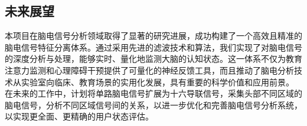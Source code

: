\documentclass{ctexart}
\begin{document}
		\subsection{未来展望}
			本项目在脑电信号分析领域取得了显著的研究进展，成功构建了一个高效且精准的脑电信号特征分离体系。通过采用先进的滤波技术和算法，我们实现了对脑电信号的深度分析与处理，能够实时、量化地监测大脑的认知状态。这一体系不仅为教育注意力监测和心理障碍干预提供了可量化的神经反馈工具，而且推动了脑电分析技术从实验室向临床、教育场景的实用化发展，具有重要的科学价值和应用前景。
			在未来的工作中，计划将单路脑电信号扩展为十六导联信号，采集头部不同区域的脑电信号，分析不同区域信号间的关系，以进一步优化和完善脑电信号分析系统，以实现更全面、更精确的用户状态评估。
		
		
		
	\newpage
	
	
	\newpage
	
	
	
\end{document}
